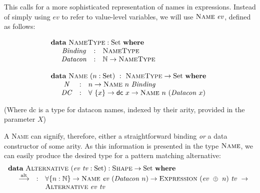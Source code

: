 \documentclass[a4paper]{jfp}
\begin{document}
This calls for a more sophisticated representation of names in expressions. Instead of simply using $\mathit{ev}$ to refer to value-level variables,
we will use $\textsc{Name}\ \mathit{ev}$, defined as follows:

\begin{displaymath}
\begin{array}{l}
         \textbf{data}\ \textsc{NameType} : \text{Set}\ \textbf{where} \\
         \quad \begin{array}{cll}
            \mathit{Binding} & : & \textsc{NameType} \\
            \mathit{Datacon} & : & \mathbb{N} \rightarrow \textsc{NameType}
         \end{array} \\ \\
         \textbf{data}\ \textsc{Name}\ (n : \text{Set})\ :\ \textsc{NameType} \rightarrow \text{Set}\ \textbf{where} \\
         \quad \begin{array}{cll}
            \mathit{N} & : & n \rightarrow \textsc{Name}\ n\ \mathit{Binding} \\
            \mathit{DC} & : & \forall\ \{ x \} \rightarrow \textsf{dc}\ x \rightarrow \textsc{Name}\ n\ (\mathit{Datacon}\ x)
         \end{array} 
         \end{array} 
\end{displaymath}

(Where \textsf{dc} is a type for datacon names, indexed by their arity, provided in the parameter $X$)


A \textsc{Name} can signify, therefore, either a straightforward binding \emph{or} a data constructor of some arity. As this information is presented
in the type $\textsc{Name}$, we can easily produce the desired type for a pattern matching alternative:
\begin{displaymath}
   \begin{array}{l}
         \textbf{data}\ \textsc{Alternative}\ (\mathit{ev}\ \mathit{tv} : \text{Set}) : \textsc{Shape} \rightarrow \text{Set}\ \textbf{where} \\
         \quad \begin{array}{lll}
            \stackrel{\text{alt}}{\longrightarrow} & : & \forall \{ n : \mathbb{N} \} \rightarrow \textsc{Name}\ \mathit{ev}\ (\mathit{Datacon}\ n)
      \rightarrow \textsc{Expression}\ (\mathit{ev}\ \oplus\ n)\ \mathit{tv}\ \rightarrow \\ & & \textsc{Alternative}\ \mathit{ev}\ \mathit{tv}
         \end{array}
         \end{array}
\end{displaymath}
\end{document}

